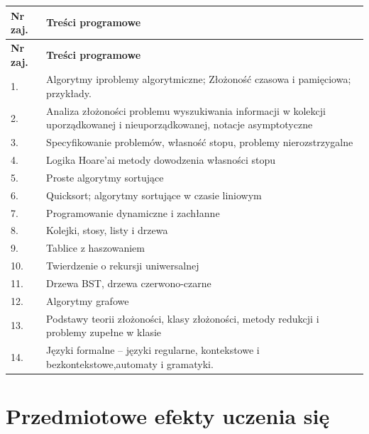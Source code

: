 \documentclass[12pt, a4paper]{article}
\newcommand{\thdrule}{\noalign{\global\setlength{\extrarowheight}{0pt}}}
\newcommand{\thdend}{\noalign{\global\setlength{\extrarowheight}{3pt}}}
\begin{document}
{\scriptsize
\begin{longtable}{m{1.5cm}m{14.5cm}}
\thdrule\toprule
\rowcolor{pjatkRed} {\color{white}\textbf{Nr zaj.}} & {\color{white}\textbf{Treści programowe}} \\
\midrule\thdend
\endfirsthead
\thdrule\toprule
\rowcolor{pjatkRed} {\color{white}\textbf{Nr zaj.}} & {\color{white}\textbf{Treści programowe}} \\
\midrule\thdend
\endhead
  \rowcolor{tableRowLight} 1. & Algorytmy iproblemy algorytmiczne; Złożoność czasowa i pamięciowa; przykłady. \\
  \rowcolor{tableRowAlt} 2. & Analiza złożoności problemu wyszukiwania informacji w kolekcji uporządkowanej i nieuporządkowanej, notacje asymptotyczne \\
  \rowcolor{tableRowLight} 3. & Specyfikowanie problemów, własność stopu, problemy nierozstrzygalne \\
  \rowcolor{tableRowAlt} 4. & Logika Hoare’ai metody dowodzenia własności stopu \\
  \rowcolor{tableRowLight} 5. & Proste algorytmy sortujące \\
  \rowcolor{tableRowAlt} 6. & Quicksort; algorytmy sortujące w czasie liniowym \\
  \rowcolor{tableRowLight} 7. & Programowanie dynamiczne i zachłanne \\
  \rowcolor{tableRowAlt} 8. & Kolejki, stosy, listy i drzewa \\
  \rowcolor{tableRowLight} 9. & Tablice z haszowaniem \\
  \rowcolor{tableRowAlt} 10. & Twierdzenie o rekursji uniwersalnej \\
  \rowcolor{tableRowLight} 11. & Drzewa BST, drzewa czerwono-czarne \\
  \rowcolor{tableRowAlt} 12. & Algorytmy grafowe \\
  \rowcolor{tableRowLight} 13. & Podstawy teorii złożoności, klasy złożoności, metody redukcji i problemy zupełne w klasie \\
  \rowcolor{tableRowAlt} 14. & Języki formalne – języki regularne, kontekstowe i bezkontekstowe,automaty i gramatyki. \\
\bottomrule
\end{longtable}}

\section{Przedmiotowe efekty uczenia się}
\end{document}
